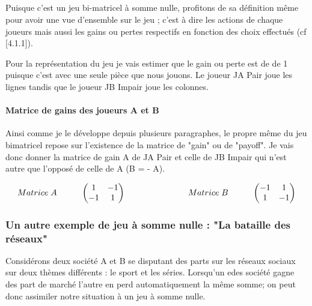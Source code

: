 \documentclass[a4paper, 12pt, twoside]{article}
\begin{document}
{{\subparagraph*{}{Puisque c'est un jeu bi-matricel à somme nulle, profitons de sa définition même pour avoir une vue d'ensemble sur le jeu ; c'est à dire les actions de chaque joueurs mais aussi les gains ou pertes respectifs en fonction des choix effectués (cf [4.1.1]).} \newline

Pour la représentation du jeu je vais estimer que le gain ou perte est de de 1 puisque c'est avec une seule pièce que nous jouons. Le joueur \textsf{JA} \textsf{Pair} joue les lignes tandis que le joueur \textsf{JB} \textsf{Impair} joue les colonnes.  \vspace{0.4 cm}

\paragraph*{Matrice de gains des joueurs A et B}{Ainsi comme je le développe depuis plusieurs paragraphes, le propre même du jeu bimatricel repose sur l'existence de la matrice de "gain" ou de "payoff".  Je vais  donc donner la matrice de gain A de \textsf{JA} \textsf{Pair} et celle de \textsf{JB} \textsf{Impair} qui n'est autre que l'opposé de celle de  A (B = - A).}

\[
Matrice\hspace{0,1cm} A\hspace{1cm}
\begin{pmatrix}1&-1\\
-1&1\\
\end{pmatrix}\                      \hspace{2,5cm}  
Matrice\hspace{0,1cm} B \hspace{1cm}  
\begin{pmatrix}-1&1\\
1&-1\\
\end{pmatrix} 
\]

\subsubsection{Un autre exemple de jeu à somme nulle : "La bataille des réseaux"}

Considérons deux société A et B se disputant des parts sur les réseaux sociaux sur deux thèmes différents : le \textsf{sport} et les \textsf{séries}. Lorsqu'un edes société gagne des part de marché l'autre en perd automatiquement la même somme; on peut donc assimiler notre situation à un jeu à somme nulle.
}}
\end{document}
